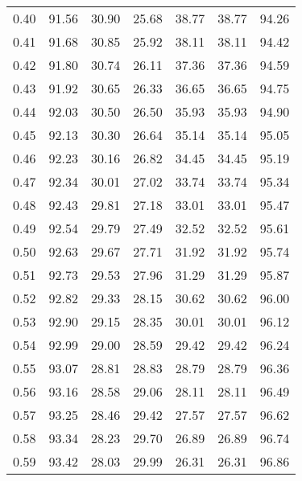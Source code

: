 \begin{tabular}{|c|c|c|c|c|c|c|}
      0.40 &     91.56 &     30.90 &      25.68 &   38.77 &      38.77 &         94.26 \\
      0.41 &     91.68 &     30.85 &      25.92 &   38.11 &      38.11 &         94.42 \\
      0.42 &     91.80 &     30.74 &      26.11 &   37.36 &      37.36 &         94.59 \\
      0.43 &     91.92 &     30.65 &      26.33 &   36.65 &      36.65 &         94.75 \\
      0.44 &     92.03 &     30.50 &      26.50 &   35.93 &      35.93 &         94.90 \\
      0.45 &     92.13 &     30.30 &      26.64 &   35.14 &      35.14 &         95.05 \\
      0.46 &     92.23 &     30.16 &      26.82 &   34.45 &      34.45 &         95.19 \\
      0.47 &     92.34 &     30.01 &      27.02 &   33.74 &      33.74 &         95.34 \\
      0.48 &     92.43 &     29.81 &      27.18 &   33.01 &      33.01 &         95.47 \\
      0.49 &     92.54 &     29.79 &      27.49 &   32.52 &      32.52 &         95.61 \\
      0.50 &     92.63 &     29.67 &      27.71 &   31.92 &      31.92 &         95.74 \\
      0.51 &     92.73 &     29.53 &      27.96 &   31.29 &      31.29 &         95.87 \\
      0.52 &     92.82 &     29.33 &      28.15 &   30.62 &      30.62 &         96.00 \\
      0.53 &     92.90 &     29.15 &      28.35 &   30.01 &      30.01 &         96.12 \\
      0.54 &     92.99 &     29.00 &      28.59 &   29.42 &      29.42 &         96.24 \\
      0.55 &     93.07 &     28.81 &      28.83 &   28.79 &      28.79 &         96.36 \\
      0.56 &     93.16 &     28.58 &      29.06 &   28.11 &      28.11 &         96.49 \\
      0.57 &     93.25 &     28.46 &      29.42 &   27.57 &      27.57 &         96.62 \\
      0.58 &     93.34 &     28.23 &      29.70 &   26.89 &      26.89 &         96.74 \\
      0.59 &     93.42 &     28.03 &      29.99 &   26.31 &      26.31 &         96.86 \\

\end{tabular}
